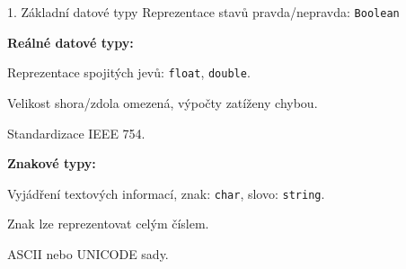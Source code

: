 \documentclass[czech]{beamer}
\begin{document}
\begin{frame}[plain]{1. Základní datové typy}
{\scriptsize Reprezentace stavů pravda/nepravda: }{\scriptsize\texttt{Boolean}}{\scriptsize\medskip{}
}{\scriptsize\par}

{\scriptsize\textbf{Reálné datové typy:}}{\scriptsize{} }{\scriptsize\par}

{\scriptsize Reprezentace spojitých jevů: }{\scriptsize\texttt{float}}{\scriptsize ,
}{\scriptsize\texttt{double}}{\scriptsize .}{\scriptsize\par}

{\scriptsize Velikost shora/zdola omezená, výpočty zatíženy chybou.}{\scriptsize\par}

{\scriptsize Standardizace IEEE 754.}{\scriptsize\par}

{\scriptsize\medskip{}
}{\scriptsize\par}

{\scriptsize\textbf{Znakové typy:}}{\scriptsize\par}

{\scriptsize Vyjádření textových informací, znak: }{\scriptsize\texttt{char}}{\scriptsize ,
slovo: }{\scriptsize\texttt{string}}{\scriptsize .}{\scriptsize\par}

{\scriptsize Znak lze reprezentovat celým číslem.}{\scriptsize\par}

{\scriptsize ASCII nebo UNICODE sady.}{\scriptsize\par}
\end{frame}
\end{document}
